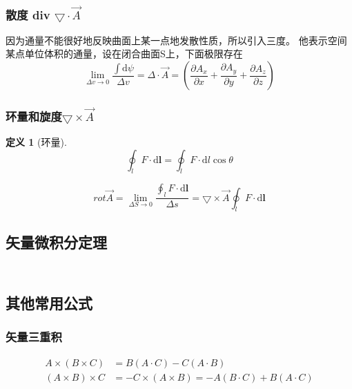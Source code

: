 \documentclass[twocolumn]{ctexart}
\newtheorem{definition}{定义}[section]
\begin{document}
\subsubsection{散度 div $\bigtriangledown \cdot \vec{A}$}
因为通量不能很好地反映曲面上某一点地发散性质，所以引入三度。
他表示空间某点单位体积的通量，设在闭合曲面S上，下面极限存在
\begin{equation}
 \lim_{\Delta v \to 0} \frac{\int\mathrm{d}\psi}{\Delta v}=\Delta \cdot \vec{A}=(\frac{\partial A_x }{\partial x}+\frac{\partial A_y }{\partial y}+\frac{\partial A_z}{\partial z})   \tag{1.3}
\end{equation}
\subsubsection{环量和旋度$\bigtriangledown \times  \vec{A}$}
\begin{definition}[环量]
\begin{equation}
\oint_{l} F \cdot \mathrm{d}{\textbf{l}}=\oint_{l} F \cdot \mathrm{d}{{l}} \cos \theta  \tag{1.3}
\end{equation}
\end{definition}
\begin{equation}
rot \vec{A}=\lim_{\Delta S \to 0} \frac{\oint_{l} F \cdot \mathrm{d}{\textbf{l}}}{\Delta s}=\bigtriangledown \times \vec{A} \oint_{l} F \cdot \mathrm{d}{\textbf{l}}
\tag{1.4}
\end{equation}
\subsection{矢量微积分定理}
\begin{align}
 \tag{1.5.a} \\
\end{align}
\subsection{其他常用公式}
\subsubsection{矢量三重积}
\begin{align}
  A \times(B \times C)&=B(A \cdot C)-C(A \cdot B)  \tag{1.8.a} \\
  ( A \times B ) \times C &= - C \times ( A \times B ) = - A ( B \cdot C ) + B ( A \cdot C )  \tag{1.8.b} 
\end{align}
\end{document}
